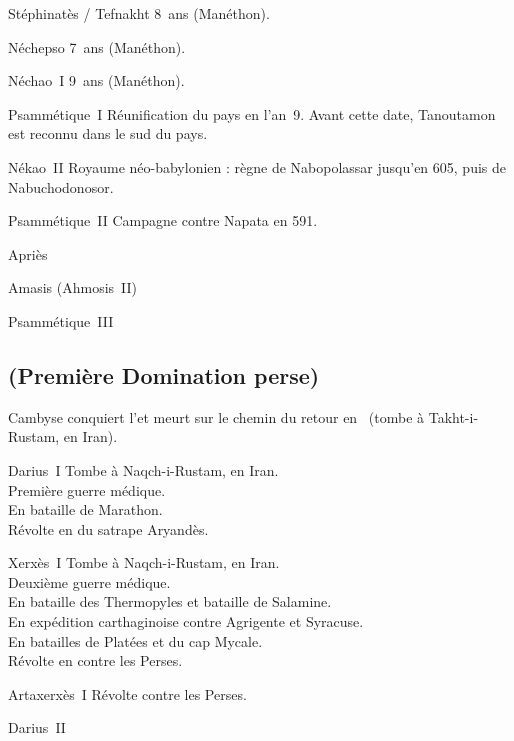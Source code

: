 \begin{listerois}
  \item [Stéphinatès / Tefnakht] \num{8}~ans (Manéthon).
  \item [Néchepso] \num{7}~ans (Manéthon).
  \item [Néchao~I\ier] \num{9}~ans (Manéthon).
  \item [Psammétique~I\ier \datation{(\anorange{663}{609})}] 
        Réunification du pays en l'an~\num{9}. Avant cette date, 
        Tanoutamon est reconnu dans le sud du pays.
  \item [Nékao~II \datation{(\anorange{609}{594})}]
        Royaume néo-babylonien : règne de Nabopolassar jusqu'en 605, 
        puis de Nabuchodonosor.
  \item [Psammétique~II \datation{(\anorange{594}{588})}] 
        Campagne contre Napata en 591.
  \item [Apriès \datation{(\anorange{588}{568})}]
  \item [Amasis (Ahmosis~II) \datation{(\anorange{568}{526})}]
  \item [Psammétique~III \datation{(\anorange{526}{525})}]
\end{listerois}

\subsection{\texorpdfstring{}{XXVIIe dynastie} (Première 
            Domination perse)}


Cambyse conquiert l'\kmt et meurt sur le chemin du retour en~ 
(tombe à Takht-i-Rustam, en Iran).

\begin{listerois}
  \item [Darius~I\ier \datation{(\anorange{522}{485})}] 
        Tombe à Naqch-i-Rustam, en Iran. \\
        Première guerre médique. \\
        En  bataille de Marathon. \\
        Révolte en \kmt du satrape Aryandès.
  \item [Xerxès~I\ier \datation{(\anorange{485}{464})}] 
        Tombe à Naqch-i-Rustam, en Iran. \\
        Deuxième guerre médique. \\
        En  bataille des Thermopyles et bataille de 
        Salamine. \\
        En  expédition carthaginoise contre Agrigente et 
        Syracuse. \\
        En  batailles de Platées et du cap Mycale. \\
        Révolte en \kmt contre les Perses.
  \item [Artaxerxès~I\ier \datation{(\anorange{464}{424})}]  
        Révolte contre les Perses.
  \item [Darius~II \datation{(\anorange{424}{404})}] 
\end{listerois}

